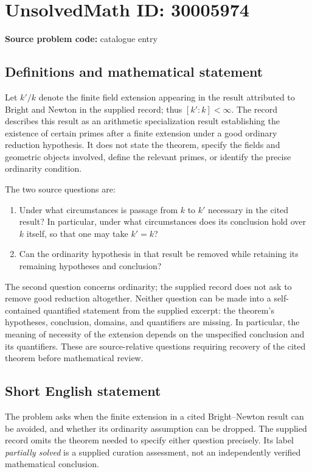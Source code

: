 \documentclass[11pt]{article}
\begin{document}
\section*{UnsolvedMath ID: 30005974}
\textbf{Source problem code:} catalogue entry
\subsection{Definitions and mathematical statement}
Let \(k'/k\) denote the finite field extension appearing in the result attributed to Bright and Newton in the supplied record; thus \([k':k]<\infty\). The record describes this result as an arithmetic specialization result establishing the existence of certain primes after a finite extension under a good ordinary reduction hypothesis. It does not state the theorem, specify the fields and geometric objects involved, define the relevant primes, or identify the precise ordinarity condition.

The two source questions are:
\begin{enumerate}
\item Under what circumstances is passage from \(k\) to \(k'\) necessary in the cited result? In particular, under what circumstances does its conclusion hold over \(k\) itself, so that one may take \(k'=k\)?
\item Can the ordinarity hypothesis in that result be removed while retaining its remaining hypotheses and conclusion?
\end{enumerate}
The second question concerns ordinarity; the supplied record does not ask to remove good reduction altogether. Neither question can be made into a self-contained quantified statement from the supplied excerpt: the theorem's hypotheses, conclusion, domains, and quantifiers are missing. In particular, the meaning of necessity of the extension depends on the unspecified conclusion and its quantifiers. These are source-relative questions requiring recovery of the cited theorem before mathematical review.
\subsection{Short English statement}
The problem asks when the finite extension in a cited Bright--Newton result can be avoided, and whether its ordinarity assumption can be dropped. The supplied record omits the theorem needed to specify either question precisely. Its label \emph{partially solved} is a supplied curation assessment, not an independently verified mathematical conclusion.
\end{document}
